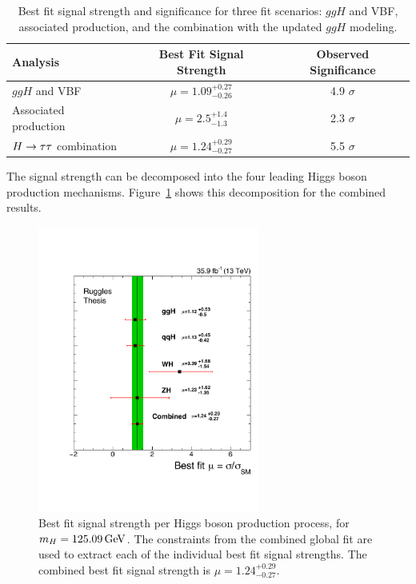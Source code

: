 \begin{table}[htbp]
\renewcommand{\arraystretch}{1.3}
\centering
\begin{tabular}{lcc}
Analysis         &   Best Fit Signal Strength    &   Observed Significance    \\
\hline
$ggH$ and VBF             &   $\mu = 1.09 ^{+0.27} _{-0.26}$   &  4.9 $\sigma$     \\
Associated production     &   $\mu = 2.5  ^{+1.4}  _{-1.3}$    &  2.3 $\sigma$     \\
$H\to\tau\tau$ combination        &   $\mu = 1.24 ^{+0.29} _{-0.27}$   &  5.5 $\sigma$     \\
\hline
\end{tabular}
\caption{
Best fit signal strength and significance for three fit scenarios: $ggH$ and VBF,
associated production, and the combination with the updated $ggH$ modeling.
}
\label{tab:cmb_mu_and_sig}
\end{table}


The signal strength can be decomposed into the four leading Higgs boson production 
mechanisms. Figure~\ref{fig:cmb_mu_higgs_processes} shows this decomposition for
the combined results. 

\begin{figure}[!ht]
 \begin{center}
  \includegraphics[width=0.65\textwidth]{higgs_to_taus_vh/plots/combined/mu_higgs_procs2.pdf}
 \end{center}
 \caption{
 Best fit signal strength per Higgs boson production process, for $m_{H} = 125.09\,\mathrm{GeV}$.
 The constraints from the combined global fit are used to extract each of the 
 individual best fit signal strengths. The combined best fit signal strength 
 is $\mu = 1.24 ^{+0.29} _{-0.27}$.
 }
 \label{fig:cmb_mu_higgs_processes}
\end{figure}



